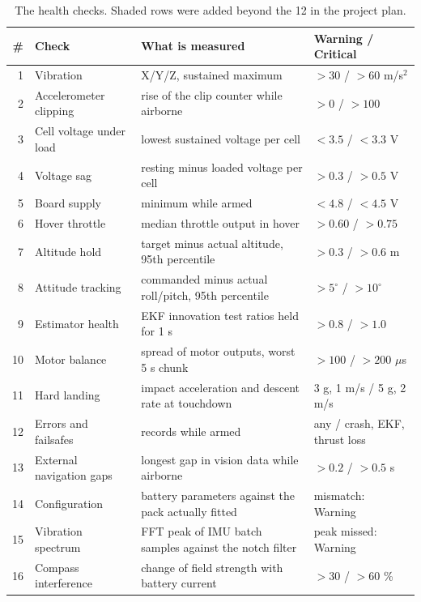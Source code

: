 \documentclass[11pt,a4paper]{article}
\newcommand{\code}[1]{\texttt{\detokenize{#1}}}
\begin{document}
\begin{table}[H]
  \centering
  \small
  \begin{tabularx}{\textwidth}{@{}rp{3.6cm}Lp{3.3cm}@{}}
    \toprule
    \textbf{\#} & \textbf{Check} & \textbf{What is measured} & \textbf{Warning / Critical} \\
     & Vibration & \code{VIBE} X/Y/Z, sustained maximum & $>30$ / $>60$ m/s$^2$ \\
    2 & Accelerometer clipping & rise of the clip counter while airborne & $>0$ / $>100$ \\
    3 & Cell voltage under load & lowest sustained voltage per cell & $<3.5$ / $<3.3$ V \\
    4 & Voltage sag & resting minus loaded voltage per cell & $>0.3$ / $>0.5$ V \\
    5 & Board supply & \code{POWR.Vcc} minimum while armed & $<4.8$ / $<4.5$ V \\
    6 & Hover throttle & median throttle output in hover & $>0.60$ / $>0.75$ \\
    7 & Altitude hold & target minus actual altitude, 95th percentile & $>0.3$ / $>0.6$ m \\
    8 & Attitude tracking & commanded minus actual roll/pitch, 95th percentile & $>5^\circ$ / $>10^\circ$ \\
    9 & Estimator health & EKF innovation test ratios held for 1 s & $>0.8$ / $>1.0$ \\
    10 & Motor balance & spread of motor outputs, worst 5 s chunk & $>100$ / $>200$ $\mu$s \\
    11 & Hard landing & impact acceleration and descent rate at touchdown & 3 g, 1 m/s / 5 g, 2 m/s \\
    12 & Errors and failsafes & \code{ERR} records while armed & any / crash, EKF, thrust loss \\
     13 & External navigation gaps & longest gap in vision data while airborne & $>0.2$ / $>0.5$ s \\
     14 & Configuration & battery parameters against the pack actually fitted & mismatch: Warning \\
     15 & Vibration spectrum & FFT peak of IMU batch samples against the notch filter & peak missed: Warning \\
     16 & Compass interference & change of field strength with battery current & $>30$ / $>60$ \% \\
    \bottomrule
  \end{tabularx}
  \caption{The health checks. Shaded rows were added beyond the 12 in the project plan.}
  \label{tab:checks}
\end{table}
\end{document}
